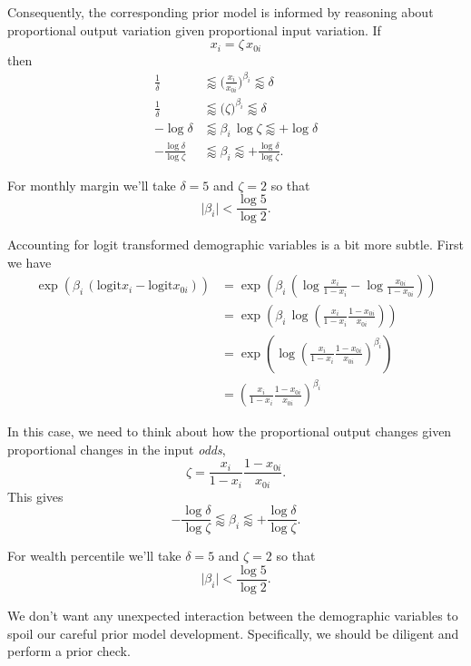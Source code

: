 \documentclass[
  letterpaper,
  DIV=11,
  numbers=noendperiod]{scrartcl}
\begin{document}
Consequently, the corresponding prior model is informed by reasoning
about proportional output variation given proportional input variation.
If \[
x_{i} = \zeta \, x_{0i}
\] then \begin{align*}
\frac{1}{\delta} &\lessapprox
\bigg( \frac{ x_{i} }{ x_{0i} } \bigg)^{\beta_{i}} \lessapprox
\delta
\\
\frac{1}{\delta} &\lessapprox
\bigg( \zeta \bigg)^{\beta_{i}} \lessapprox
\delta
\\
- \log \delta &\lessapprox
\beta_{i} \, \log\zeta \lessapprox
+ \log \delta
\\
- \frac{ \log \delta }{ \log \zeta } &\lessapprox
\beta_{i} \lessapprox
+ \frac{ \log \delta }{ \log \zeta}.
\end{align*}

For monthly margin we'll take \(\delta = 5\) and \(\zeta = 2\) so that
\[
\vert \beta_{i} \vert < \frac{ \log 5 }{ \log 2}.
\]

Accounting for logit transformed demographic variables is a bit more
subtle. First we have \begin{align*}
\exp \left(
  \beta_{i} \, (\mathrm{logit} x_{i} - \mathrm{logit} x_{0i})
\right)
&=
\exp \left(
  \beta_{i} \, \left(
      \log \frac{ x_{i} }{ 1 - x_{i} }
    - \log \frac{ x_{0i} }{ 1 - x_{0i} }
  \right)
\right)
\\
&=
\exp \left(
  \beta_{i} \,
  \log \left(
    \frac{ x_{i} }{ 1 - x_{i} } \frac{ 1 - x_{0i} }{ x_{0i} }
  \right)
\right)
\\
&=
\exp \left(
  \log \left(
    \frac{ x_{i} }{ 1 - x_{i} } \frac{ 1 - x_{0i} }{ x_{0i} }
  \right)^{\beta_{i}}
\right)
\\
&=
\left(
  \frac{ x_{i} }{ 1 - x_{i} } \frac{ 1 - x_{0i} }{ x_{0i} }
\right)^{\beta_{i}}
\end{align*}

In this case, we need to think about how the proportional output changes
given proportional changes in the input \emph{odds}, \[
\zeta
=
\frac{ x_{i} }{ 1 - x_{i} } \frac{ 1 - x_{0i} }{ x_{0i} }.
\] This gives \[
- \frac{ \log \delta }{ \log \zeta } \lessapprox
\beta_{i} \lessapprox
+ \frac{ \log \delta }{ \log \zeta}.
\]

For wealth percentile we'll take \(\delta = 5\) and \(\zeta = 2\) so
that \[
\vert \beta_{i} \vert < \frac{ \log 5 }{ \log 2}.
\]

We don't want any unexpected interaction between the demographic
variables to spoil our careful prior model development. Specifically, we
should be diligent and perform a prior check.
\end{document}
